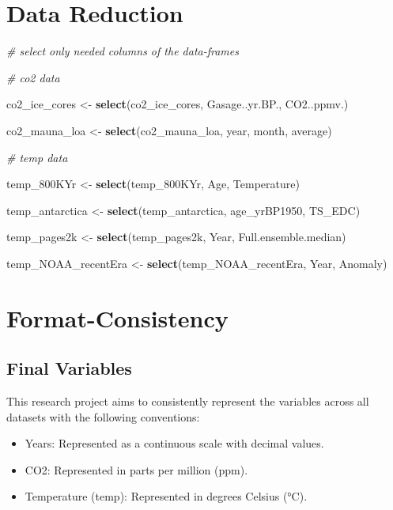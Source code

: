 \documentclass[
]{article}
\newenvironment{Shaded}{\begin{snugshade}}{\end{snugshade}}
\newcommand{\CommentTok}[1]{\textcolor[rgb]{0.56,0.35,0.01}{\textit{#1}}}
\newcommand{\FunctionTok}[1]{\textcolor[rgb]{0.13,0.29,0.53}{\textbf{#1}}}
\newcommand{\NormalTok}[1]{#1}
\newcommand{\OtherTok}[1]{\textcolor[rgb]{0.56,0.35,0.01}{#1}}
\providecommand{\tightlist}{%
  \setlength{\itemsep}{0pt}\setlength{\parskip}{0pt}}
\begin{document}
\hypertarget{data-reduction}{%
\section{Data Reduction}\label{data-reduction}}

\begin{Shaded}
\begin{Highlighting}[]
\CommentTok{\# select only needed columns of the data{-}frames}

\CommentTok{\# co2 data}

\NormalTok{co2\_ice\_cores }\OtherTok{\textless{}{-}} \FunctionTok{select}\NormalTok{(co2\_ice\_cores, Gasage..yr.BP., CO2..ppmv.)}

\NormalTok{co2\_mauna\_loa }\OtherTok{\textless{}{-}} \FunctionTok{select}\NormalTok{(co2\_mauna\_loa, year, month, average)}

\CommentTok{\# temp data}

\NormalTok{temp\_800KYr }\OtherTok{\textless{}{-}} \FunctionTok{select}\NormalTok{(temp\_800KYr, Age, Temperature)}

\NormalTok{temp\_antarctica }\OtherTok{\textless{}{-}} \FunctionTok{select}\NormalTok{(temp\_antarctica, age\_yrBP1950, TS\_EDC)}

\NormalTok{temp\_pages2k }\OtherTok{\textless{}{-}} \FunctionTok{select}\NormalTok{(temp\_pages2k, Year, Full.ensemble.median)}

\NormalTok{temp\_NOAA\_recentEra }\OtherTok{\textless{}{-}} \FunctionTok{select}\NormalTok{(temp\_NOAA\_recentEra, Year, Anomaly)}
\end{Highlighting}
\end{Shaded}

\hypertarget{format-consistency}{%
\section{Format-Consistency}\label{format-consistency}}

\hypertarget{final-variables}{%
\subsection{Final Variables}\label{final-variables}}

This research project aims to consistently represent the variables
across all datasets with the following conventions:

\begin{itemize}
\tightlist
\item
  Years: Represented as a continuous scale with decimal values.
\item
  CO2: Represented in parts per million (ppm).
\item
  Temperature (temp): Represented in degrees Celsius (°C).
\end{itemize}
\end{document}
